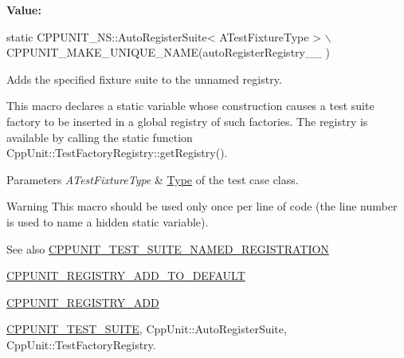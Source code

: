 {\bfseries Value\+:}
\begin{DoxyCode}
\textcolor{keyword}{static} CPPUNIT\_NS::AutoRegisterSuite< ATestFixtureType >       \(\backslash\)
             CPPUNIT\_MAKE\_UNIQUE\_NAME(autoRegisterRegistry\_\_ )
\end{DoxyCode}
Adds the specified fixture suite to the unnamed registry.

This macro declares a static variable whose construction causes a test suite factory to be inserted in a global registry of such factories. The registry is available by calling the static function Cpp\+Unit\+::\+Test\+Factory\+Registry\+::get\+Registry().


\begin{DoxyParams}{Parameters}
{\em A\+Test\+Fixture\+Type} & \hyperlink{struct_type}{Type} of the test case class. \\
\hline
\end{DoxyParams}
\begin{DoxyWarning}{Warning}
This macro should be used only once per line of code (the line number is used to name a hidden static variable). 
\end{DoxyWarning}
\begin{DoxySeeAlso}{See also}
\hyperlink{group___creating_test_suite_ga028a5855a40ad3836e2a26aa48cd4c91}{C\+P\+P\+U\+N\+I\+T\+\_\+\+T\+E\+S\+T\+\_\+\+S\+U\+I\+T\+E\+\_\+\+N\+A\+M\+E\+D\+\_\+\+R\+E\+G\+I\+S\+T\+R\+A\+T\+I\+O\+N} 

\hyperlink{group___creating_test_suite_ga9c3be3389213e1dc823ed580cc60878f}{C\+P\+P\+U\+N\+I\+T\+\_\+\+R\+E\+G\+I\+S\+T\+R\+Y\+\_\+\+A\+D\+D\+\_\+\+T\+O\+\_\+\+D\+E\+F\+A\+U\+L\+T} 

\hyperlink{group___creating_test_suite_ga0785e2e8a821f70c69a8127c35c0a667}{C\+P\+P\+U\+N\+I\+T\+\_\+\+R\+E\+G\+I\+S\+T\+R\+Y\+\_\+\+A\+D\+D} 

\hyperlink{group___writing_test_fixture_gabe1e12200f40d6f25d60c1783c99da81}{C\+P\+P\+U\+N\+I\+T\+\_\+\+T\+E\+S\+T\+\_\+\+S\+U\+I\+T\+E}, Cpp\+Unit\+::\+Auto\+Register\+Suite, Cpp\+Unit\+::\+Test\+Factory\+Registry. 
\end{DoxySeeAlso}
